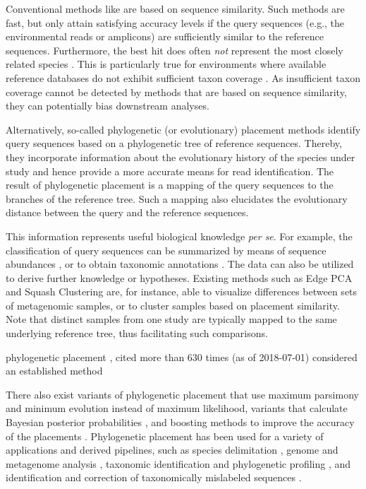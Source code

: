 Conventional methods like  \cite{Altschul1990} are based on sequence similarity.
Such methods are fast, but only attain satisfying accuracy levels
if the query sequences (e.g., the environmental reads or amplicons) are sufficiently similar to the reference sequences.
Furthermore, the best  hit does often \emph{not} represent the most closely related species \cite{Koski2001}.
This is particularly true for environments where available reference databases
do not exhibit sufficient taxon coverage \citep{Mahe2017}.
As insufficient taxon coverage cannot be detected by methods that are based on sequence similarity,
they can potentially bias downstream analyses.

Alternatively, so-called phylogenetic (or evolutionary) placement methods \cite{Matsen2010,Berger2011,Barbera2018}
identify query sequences based on a phylogenetic tree of reference sequences.
Thereby, they incorporate information about the evolutionary history of the species under study
and hence provide a more accurate means for read identification.
The result of phylogenetic placement is a mapping of the query sequences to the branches of the reference tree.
Such a mapping also elucidates the evolutionary distance between the query and the reference sequences.

This information represents useful biological knowledge \emph{per se}.
For example, the classification of query sequences can be summarized by means of sequence abundances \cite{Pace1997,Hugenholtz1998},
or to obtain taxonomic annotations \cite{Kozlov2016}.
The data can also be utilized to derive further knowledge or hypotheses.
Existing methods such as Edge PCA and Squash Clustering \cite{Matsen2011a} are, for instance, able
to visualize differences between sets of metagenomic samples,
or to cluster samples based on placement similarity.
Note that distinct samples from one study are typically mapped to the same underlying reference tree,
thus facilitating such comparisons.



phylogenetic placement \cite{Matsen2010,Berger2011,Barbera2018}, cited more than 630 times (as of 2018-07-01)
considered an established method

There also exist variants of phylogenetic placement that use maximum parsimony \cite{Berger2011}
and minimum evolution \cite{Filipski2015} instead of maximum likelihood,
variants that calculate Bayesian posterior probabilities \cite{Matsen2010},
and boosting methods to improve the accuracy of the placements \cite{Mirarab2012}.
Phylogenetic placement has been used for a variety of applications and derived pipelines, such as
species delimitation \cite{Zhang2013,Kapli2017},
genome and metagenome analysis \cite{Darling2014},
taxonomic identification and phylogenetic profiling \cite{Nguyen2014}, and
identification and correction of taxonomically mislabeled sequences \cite{Kozlov2016}.

